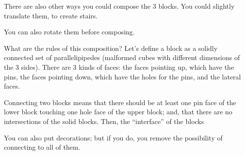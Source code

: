 There are also other ways you could compose the 3 blocks. You could slightly translate them, to create stairs.


You can also rotate them before composing.


What are the rules of this composition? Let's define a block as a solidly connected set of parallelipipedes (malformed cubes with different dimensions of the 3 sides). There are 3 kinds of faces: the faces pointing up, which have the pins, the faces pointing down, which have the holes for the pins, and the lateral faces.

Connecting two blocks means that there should be at least one pin face of the lower block touching one hole face of the upper block; and, that there are no intersections of the solid blocks. Then, the ``interface'' of the blocks


You can also put decorations; but if you do, you remove the possibility of connecting to all of them.



